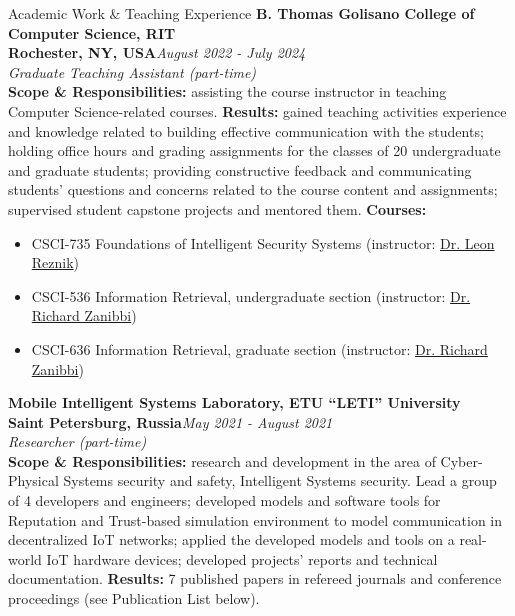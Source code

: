 \documentclass[10pt]{resume} %
\begin{document}
\begin{rSection}{Academic Work \& Teaching Experience}
\textbf{B. Thomas Golisano College of Computer Science, RIT}\\
\textbf{Rochester, NY, USA}\hfill\small{\em August 2022 - July 2024}\normalsize\\
{\em Graduate Teaching Assistant (part-time)}
\\\textbf{Scope \& Responsibilities:} assisting the course instructor in teaching Computer Science-related courses. \textbf{Results:} gained teaching activities experience and knowledge related to building effective communication with the students; holding office hours and grading assignments for the classes of 20 undergraduate and graduate students; providing constructive feedback and communicating students' questions and concerns related to the course content and assignments; supervised student capstone projects and mentored them. 
\textbf{Courses:}
\begin{itemize}
\itemsep-0.5em 
    \item CSCI-735 Foundations of Intelligent Security Systems (instructor: \href{https://www.rit.edu/directory/lrvcs-leon-reznik}{Dr. Leon Reznik})
    \item CSCI-536 Information Retrieval, undergraduate section (instructor: \href{https://www.rit.edu/directory/rxzvcs-richard-zanibbi}{Dr. Richard Zanibbi}) 
    \item CSCI-636 Information Retrieval, graduate section (instructor: \href{https://www.rit.edu/directory/rxzvcs-richard-zanibbi}{Dr. Richard Zanibbi})
\end{itemize}

\textbf{Mobile Intelligent Systems Laboratory, ETU ``LETI'' University}
\\
\textbf{Saint Petersburg, Russia}\hfill \small{\em May 2021 - August 2021}\normalsize\\
{\em Researcher (part-time)}
\\\textbf{Scope \& Responsibilities:} research and development in the area of Cyber-Physical Systems security and safety, Intelligent Systems security. Lead a group of 4 developers and engineers; developed models and software tools for Reputation and Trust-based simulation environment to model communication in decentralized IoT networks; applied the developed models and tools on a real-world IoT hardware devices; developed projects' reports and technical documentation. \textbf{Results:} 7 published papers in refereed journals and conference proceedings (see Publication List below).     


\end{rSection}
\end{document}
